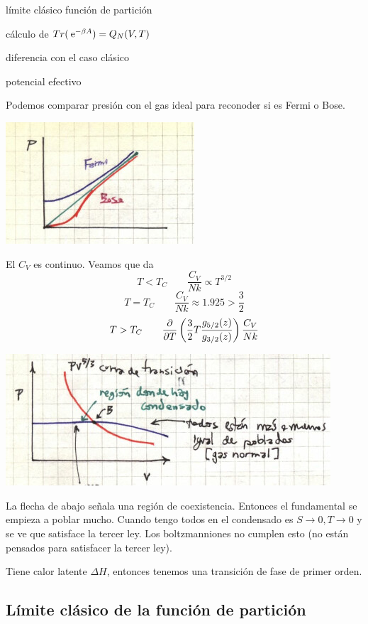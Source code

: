 \documentclass[10pt,oneside]{CBFT_book}
\begin{document}
límite clásico función de partición

cálculo de $ Tr (\:\mathrm{e}^{-\beta A} ) = Q_N(V,T) $

diferencia con el caso clásico

potencial efectivo


Podemos comparar presión con el gas ideal para reconoder si es Fermi o Bose.

\includegraphics[scale=0.5]{images/1606329551.jpg}


El $C_V$ es continuo. Veamos que da
\[
	T<T_C \qquad \frac{C_V}{Nk} \propto T^{3/2}
\]
\[
	T=T_C \qquad \frac{C_V}{Nk} \approx 1.925 > \frac 3 2
\]
\[
	T>T_C \qquad \frac{\partial^{\hspace{-0.05em}} {}}{\partial {T}^{\hspace{-0.05em}}}\left( \frac{3}{2} T \frac{g_{5/2}(z)}{g_{3/2}(z)} \right) \frac{C_V}{Nk} 
\]


\includegraphics[scale=0.5]{images/1606329555.jpg}

La flecha de abajo señala una región de coexistencia. Entonces el fundamental se empieza a poblar mucho.
Cuando tengo todos en el condensado es $ S \to 0, T \to 0$ y se ve que satisface la tercer ley.
Los boltzmanniones no cumplen esto (no están pensados para satisfacer la tercer ley).

Tiene calor latente $ \Delta H $, entonces tenemos una transición de fase de primer orden.

\subsection{Límite clásico de la función de partición}
\end{document}
